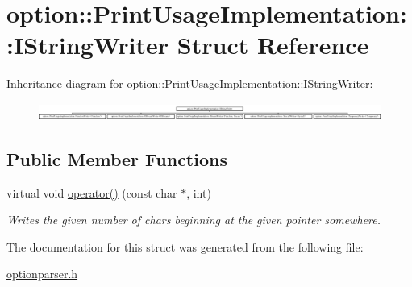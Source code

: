 \hypertarget{structoption_1_1_print_usage_implementation_1_1_i_string_writer}{}\section{option\+:\+:Print\+Usage\+Implementation\+:\+:I\+String\+Writer Struct Reference}
\label{structoption_1_1_print_usage_implementation_1_1_i_string_writer}
Inheritance diagram for option\+:\+:Print\+Usage\+Implementation\+:\+:I\+String\+Writer\+:\begin{figure}[H]
\begin{center}
\leavevmode
\includegraphics[height=0.555831cm]{structoption_1_1_print_usage_implementation_1_1_i_string_writer}
\end{center}
\end{figure}
\subsection*{Public Member Functions}
\begin{DoxyCompactItemize}
\item 
\mbox{\label{structoption_1_1_print_usage_implementation_1_1_i_string_writer_a497172d92e09072a16996c127dd3def8}} 
virtual void \hyperlink{structoption_1_1_print_usage_implementation_1_1_i_string_writer_a497172d92e09072a16996c127dd3def8}{operator()} (const char $\ast$, int)
\begin{DoxyCompactList}\small\item\em Writes the given number of chars beginning at the given pointer somewhere. \end{DoxyCompactList}\end{DoxyCompactItemize}


The documentation for this struct was generated from the following file\+:\begin{DoxyCompactItemize}
\item 
\hyperlink{optionparser_8h}{optionparser.\+h}\end{DoxyCompactItemize}
